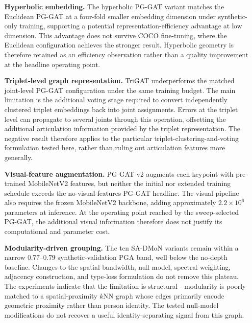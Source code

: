 \begin{compactitem}
\item \textbf{Hyperbolic embedding.}
The hyperbolic PG-GAT variant matches the Euclidean PG-GAT at a
four-fold smaller embedding dimension under synthetic-only training,
supporting a potential representation-efficiency advantage at low
dimension.
This advantage does not survive COCO fine-tuning,
where the Euclidean configuration achieves the stronger result.
Hyperbolic geometry is therefore retained as an efficiency observation
rather than a quality improvement at the headline operating point.

\item \textbf{Triplet-level graph representation.}
TriGAT underperforms the matched joint-level PG-GAT configuration under
the same training budget.
The main limitation is the additional voting stage required to convert
independently clustered triplet embeddings back into joint assignments.
Errors at the triplet level can propagate to several joints through this
operation,
offsetting the additional articulation information provided by the
triplet representation.
The negative result therefore applies to the particular
triplet-clustering-and-voting formulation tested here,
rather than ruling out articulation features more generally.

\item \textbf{Visual-feature augmentation.}
PG-GAT v2 augments each keypoint with pre-trained MobileNetV2 features,
but neither the initial nor extended training schedule exceeds the
no-visual-features PG-GAT headline.
The visual pipeline also requires the frozen MobileNetV2 backbone,
adding approximately $2.2 \times 10^{6}$ parameters at inference.
At the operating point reached by the sweep-selected PG-GAT,
the additional visual information therefore does not justify its
computational and parameter cost.

\item \textbf{Modularity-driven grouping.}
The ten SA-DMoN variants remain within a narrow $0.77$--$0.79$
synthetic-validation PGA band,
well below the no-depth baseline.
Changes to the spatial bandwidth,
null model,
spectral weighting,
adjacency construction,
and type-loss formulation do not remove this plateau.
The experiments indicate that the limitation is structural -
modularity is poorly matched to a spatial-proximity $k$NN graph whose
edges primarily encode geometric proximity rather than person identity.
The tested null-model modifications do not recover a useful
identity-separating signal from this graph.
\end{compactitem}

